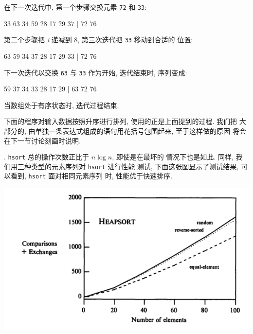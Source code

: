 在下一次迭代中, 第一个步骤交换元素 \texttt{72} 和 \texttt{33}:
\begin{file}
    33 63 34 59 28 17 29 37 | 72 76
\end{file}
第二个步骤把 \textit{i} 递减到 8, 第三次迭代把 \texttt{33} 移动到合适的 
位置:
\begin{file}
    63 59 34 37 28 17 29 33 | 72 76
\end{file}
下一次迭代以交换 \verb'63' 与 \verb'33' 作为开始, 迭代结束时, 序列变成:
\begin{file}
    59 37 34 33 28 17 29 | 63 72 76
\end{file}
当数组处于有序状态时, 迭代过程结束.

下面的程序对输入数据按照升序进行排列, 使用的正是上面提到的过程. 我们把 
大部分的, 由单独一条表达式组成的语句用花括号包围起来, 至于这样做的原因
将会在下一节讨论刻画时说明.

. \verb'hsort' 总的操作次数正比于 $n\log n$, 即使是在最坏的
情况下也是如此. 同样, 我们用三种类型的元素序列对 \verb'hsort' 进行性能
测试, 下面这张图显示了测试结果, 可以看到, \verb'hsort' 面对相同元素序列
时, 性能优于快速排序.
\begin{center}
    \includegraphics[scale=0.7]{images/heap_sort.png}
\end{center}

